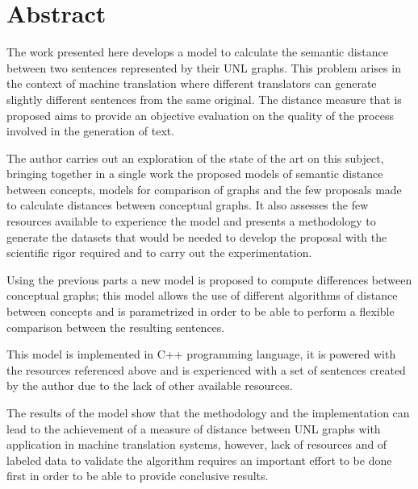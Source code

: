 \documentclass[a4paper,12pt,spanish]{book}
\begin{document}
\chapter*{Abstract}
The work presented here develops a model to calculate the semantic distance
between two sentences represented by their UNL graphs. This problem arises
in the context of machine translation where different translators can generate
slightly different sentences from the same original. The distance measure that
is proposed aims to provide an objective evaluation on the quality of the
process involved in the generation of text.

The author carries out an exploration of the state of the art on this subject,
bringing together in a single work the proposed models of semantic distance between
concepts, models for comparison of graphs and the few proposals made to calculate
distances between conceptual graphs. It also assesses the few resources available
to experience the model and presents a methodology to generate the datasets that
would be needed to develop the proposal with the scientific rigor required
and to carry out the experimentation.

Using the previous parts a new model is proposed to compute differences between
conceptual graphs; this model allows the use of different algorithms of distance
between concepts and is parametrized in order to be able to perform a flexible
comparison between the resulting sentences.

This model is implemented in C++ programming language, it is powered with the
resources referenced above and is experienced with a set of sentences created
by the author due to the lack of other available resources.

The results of the model show that the methodology and the implementation can
lead to the achievement of a measure of distance between UNL graphs with application
in machine translation systems, however, lack of resources and of labeled data
to validate the algorithm requires an important effort to be done first in order
to be able to provide conclusive results.

\cleardoublepage
\tableofcontents
{}\label{index::doc}


\cleardoublepage
{}
{}
\listoffigures

\cleardoublepage
{}
{}
\listoftables\newpage\mainmatter
{}
\end{document}

